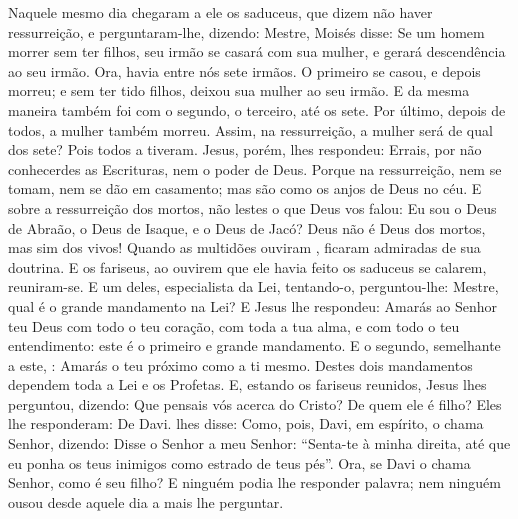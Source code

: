 {  Naquele mesmo dia chegaram a ele os saduceus, que dizem não haver ressurreição, e perguntaram-lhe,
  dizendo: Mestre, Moisés disse: Se um homem morrer sem ter filhos, seu irmão se casará com sua mulher, e gerará descendência
 ao seu irmão.
{}
  Ora, havia entre nós sete irmãos. O primeiro se casou, e depois morreu; e sem ter tido filhos,
 deixou sua mulher ao seu irmão.
  E da mesma maneira também foi com o segundo, o terceiro, até os sete.
  Por último, depois de todos, a mulher também morreu.
  Assim, na ressurreição, a mulher será de qual dos sete? Pois todos a tiveram.
  Jesus, porém, lhes respondeu: Errais, por não conhecerdes as Escrituras, nem o poder de Deus.
  Porque na ressurreição, nem se tomam, nem se dão em casamento; mas são como os anjos de Deus no céu.
  E sobre a ressurreição dos mortos, não lestes o que Deus vos falou:
  Eu sou o Deus de Abraão, o Deus de Isaque, e o Deus de Jacó?
{} Deus não é Deus dos mortos, mas sim dos vivos!
  Quando as multidões ouviram
{}, ficaram admiradas de sua doutrina.
  E os fariseus, ao ouvirem que ele havia feito os saduceus se calarem, reuniram-se.
  E um deles, especialista da Lei, tentando-o, perguntou-lhe:
  Mestre, qual é o grande mandamento na Lei?
  E Jesus lhe respondeu: Amarás ao Senhor teu Deus com todo o teu coração, com toda a tua alma, e com todo o teu entendimento:
{}
  este é o primeiro e grande mandamento.
  E o segundo, semelhante a este,
{} : Amarás o teu próximo como a ti mesmo.
{}
  Destes dois mandamentos dependem toda a Lei e os Profetas.
  E, estando os fariseus reunidos, Jesus lhes perguntou,
  dizendo: Que pensais vós acerca do Cristo? De quem ele é filho? Eles lhe responderam: De Davi.
   lhes disse: Como, pois, Davi, em espírito, o chama Senhor, dizendo:
  Disse o Senhor a meu Senhor: “Senta-te à minha direita, até que eu ponha os teus inimigos como estrado de teus pés”.
{}
  Ora, se Davi o chama Senhor, como é seu filho?
  E ninguém podia lhe responder palavra; nem ninguém ousou desde aquele dia a mais lhe perguntar.
\par }

